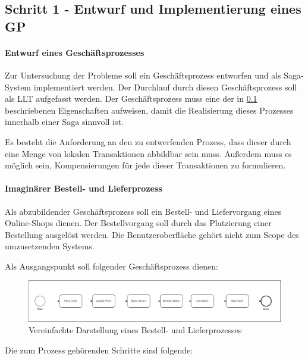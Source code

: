 \subsection{Schritt 1 - Entwurf und Implementierung eines GP}


\paragraph*{Entwurf eines Geschäftsprozesses}

Zur Untersuchung der Probleme soll ein Geschäftsprozess entworfen und als Saga-System implementiert werden. Der Durchlauf durch diesen Geschäftsprozess soll als LLT aufgefasst werden. Der Geschäftsprozess muss eine der in \ref{} beschriebenen Eigenschaften aufweisen, damit die Realisierung dieses Prozesses innerhalb einer Saga sinnvoll ist.  

Es besteht die Anforderung an den zu entwerfenden Prozess, dass dieser durch eine Menge von lokalen Transaktionen abbildbar sein muss. Außerdem muss es möglich sein, Kompensierungen für jede dieser Transaktionen zu formulieren. 

\paragraph*{Imaginärer Bestell- und Lieferprozess}

Als abzubildender Geschäftsprozess soll ein Bestell- und Liefervorgang eines Online-Shops dienen. Der Bestellvorgang soll durch das Platzierung einer Bestellung ausgelöst werden. Die Benutzeroberfläche gehört nicht zum Scope des umzusetzenden Systems. 

Als Ausgangspunkt soll folgender Geschäftsprozess dienen:

\begin{figure}[h!]
	\includegraphics[width=\linewidth]{figures/SimplifiedBusinessProcess.png}
	\caption{Vereinfachte Darstellung eines Bestell- und Lieferprozesses}
\end{figure}



Die zum Prozess gehörenden Schritte sind folgende:

